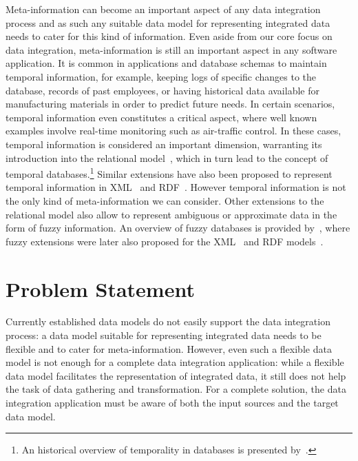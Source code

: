Meta-information can become an important aspect of any data integration process and as such any suitable data model for
representing integrated data needs to cater for this kind of information.
%
Even aside from our core focus on data integration, meta-information is still an important aspect in any software
application.
%
It is common in applications and database schemas to maintain temporal information, for example, keeping logs of
specific changes to the database, records of past employees, or having historical data available for manufacturing
materials in order to predict future needs.
%
In certain scenarios, temporal information even constitutes a critical aspect, where well known examples involve
real-time monitoring such as air-traffic control.
%
In these cases, temporal information is considered an important dimension, warranting its introduction into the
relational model~\cite{AbiteboulHullVianu:1995aa,Snodgrass:1999aa}, which in turn lead to the concept of temporal
databases.\footnote{An historical overview of temporality in databases is presented by~\citet{Snodgrass:1990aa}.}
%
Similar extensions have also been proposed to represent temporal information in
\ac{XML}~\cite{AmagasaYoshikawaUemura:2000aa,RizzoloVaisman:2008aa} and
\ac{RDF}~\cite{GutierrezHurtadoVaisman:2007aa,PuglieseUdreaSubrahmanian:2008aa,TappoletBernstein:2009aa}.
%
However temporal information is not the only kind of meta-information we can consider.  Other extensions to the
relational model also allow to represent ambiguous or approximate data in the form of fuzzy information.  An overview of
fuzzy databases is provided by~\citet{MaYan:2008aa}, where fuzzy extensions were later also proposed for the
\ac{XML}~\cite{MaYan:2007aa} and \ac{RDF} models~\cite{Straccia:2009aa,MazzieriDragoni:2008aa,LvMaYan:2008aa}.




\section{Problem Statement}
\label{sec:problem-statement}


Currently established data models do not easily support the data integration process: a data model suitable for
representing integrated data needs to be flexible and to cater for meta-information.
%
However, even such a flexible data model is not enough for a complete data integration application: while a flexible
data model facilitates the representation of integrated data, it still does not help the task of data gathering and
transformation.
%
For a complete solution, the data integration application must be aware of both the input sources and the target data
model.


